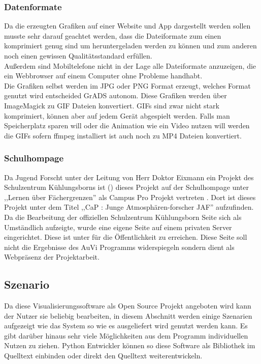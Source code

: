 \subsubsection{Datenformate} %
Da die erzeugten Grafiken auf einer Website und App dargestellt werden sollen
musste sehr darauf geachtet werden,
dass die Dateiformate zum einen komprimiert genug sind
um heruntergeladen werden zu können und zum anderen
noch einen gewissen Qualitätsstandard erfüllen.\\
Außerdem sind Mobiltelefone nicht in der Lage alle
Dateiformate anzuzeigen,
die ein Webbrowser auf einem Computer ohne Probleme handhabt.\\
Die Grafiken selbst werden im JPG oder PNG Format erzeugt, welches
Format genutzt wird entscheided GrADS autonom. Diese Grafiken werden
über ImageMagick zu GIF Dateien konvertiert. GIFs sind zwar nicht stark
komprimiert, können aber auf jedem Gerät abgespielt werden.
Falls man Speicherplatz sparen will oder die Animation wie ein Video nutzen will
werden die GIFs sofern ffmpeg installiert ist auch noch zu MP4 Dateien konvertiert.

\subsubsection{Schulhompage} %
Da Jugend Forscht unter der Leitung von Herr Doktor Eixmann
ein Projekt des Schulzentrum Kühlungsborns ist
() dieses Projekt auf der Schulhompage
unter ,,Lernen über Fächergrenzen'' als Campus Pro Projekt vertreten \cite{szkb}.
Dort ist dieses Projekt unter dem Titel ,,CaP \jf : Junge Atmosphären-forscher JAF'' aufzufinden.
Da die Bearbeitung der offiziellen Schulzentrum Kühlungsborn Seite sich als Umständlich aufzeigte,
wurde eine eigene Seite auf einem privaten Server eingerichtet.
Diese ist unter 
für die Öffentlichkeit zu erreichen.
Diese Seite soll nicht die Ergebnisse des AuVi Programms
widerspiegeln sondern dient als Webpräsenz der Projektarbeit.

\subsection{Szenario} %
Da diese Visualisierungssoftware als Open Source Projekt angeboten wird kann der Nutzer
sie beliebig bearbeiten, in diesem Abschnitt werden einige Szenarien aufgezeigt wie das System
so wie es ausgeliefert wird genutzt werden kann.
Es gibt darüber hinaus sehr viele Möglichkeiten aus dem Programm individuellen Nutzen zu ziehen.
Python Entwickler können so diese Software als Bibliothek im Quelltext einbinden oder direkt den Quelltext
weiterentwickeln.


